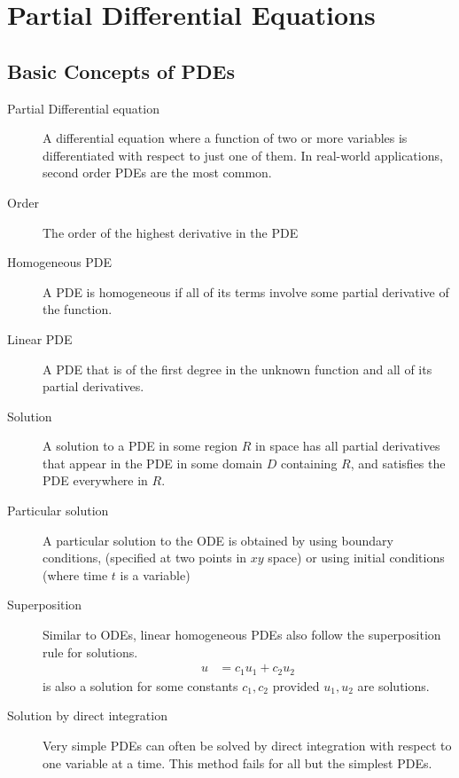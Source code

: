 \chapter{Partial Differential Equations}

\section{Basic Concepts of PDEs}

\begin{description}
    \item[Partial Differential equation] A differential equation where a function of two
        or more variables is differentiated with respect to just one of them. In
        real-world applications, second order PDEs are the most common.

    \item[Order] The order of the highest derivative in the PDE
    \item[Homogeneous PDE] A PDE is homogeneous if all of its terms involve some partial
        derivative of the function.
    \item[Linear PDE] A PDE that is of the first degree in the unknown function and all
        of its partial derivatives.

    \item[Solution] A solution to a PDE in some region $ R $ in space has all partial
        derivatives that appear in the PDE in some domain $ D $ containing $ R $, and
        satisfies the PDE everywhere in $ R $.

    \item[Particular solution] A particular solution to the ODE is obtained by using
        boundary conditions, (specified at two points in $ xy $ space) or using initial
        conditions (where time $ t $ is a variable)

    \item[Superposition] Similar to ODEs, linear homogeneous PDEs also follow the
        superposition rule for solutions.
        \begin{align}
            u & = c_1 u_1 + c_2 u_2
        \end{align}
        is also a solution for some constants $ c_1, c_2 $ provided $ u_1,u_2 $ are
        solutions.

    \item[Solution by direct integration] Very simple PDEs can often be solved by
        direct integration with respect to one variable at a time. This method fails for
        all but the simplest PDEs.
\end{description}

